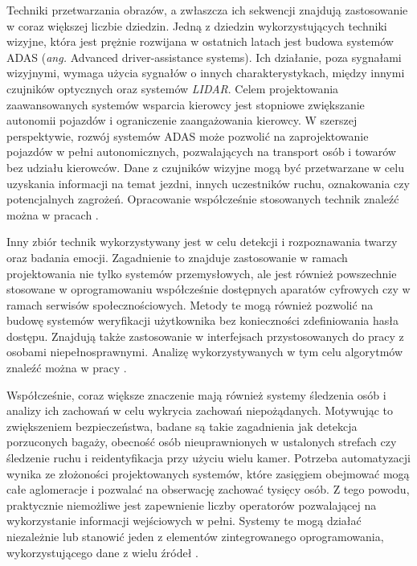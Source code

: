 Techniki przetwarzania obrazów, a zwłaszcza ich sekwencji znajdują zastosowanie w coraz większej liczbie dziedzin. %
Jedną z dziedzin wykorzystujących techniki wizyjne, która jest prężnie rozwijana w ostatnich latach jest budowa systemów ADAS (\emph{ang.} Advanced driver-assistance systems). %
Ich działanie, poza sygnałami wizyjnymi, wymaga użycia sygnałów o innych charakterystykach, między innymi czujników optycznych oraz systemów \emph{LIDAR}.
Celem projektowania zaawansowanych systemów wsparcia kierowcy jest stopniowe zwiększanie autonomii pojazdów i ograniczenie zaangażowania kierowcy. W szerszej perspektywie, rozwój systemów ADAS może pozwolić na zaprojektowanie pojazdów w pełni autonomicznych, pozwalających na transport osób i towarów bez udziału kierowców.
Dane z czujników wizyjne mogą być przetwarzane w celu uzyskania informacji na temat jezdni, innych uczestników ruchu, oznakowania czy potencjalnych zagrożeń. 
Opracowanie współcześnie stosowanych technik znaleźć można w pracach \cite{Bengler2014,Velez2017}.

Inny zbiór technik wykorzystywany jest w celu detekcji i rozpoznawania twarzy oraz badania emocji. %
Zagadnienie to znajduje zastosowanie w ramach projektowania nie tylko systemów przemysłowych, ale jest również powszechnie stosowane w oprogramowaniu współcześnie dostępnych aparatów cyfrowych czy w ramach serwisów społecznościowych. Metody te mogą również pozwolić na budowę systemów weryfikacji użytkownika bez konieczności zdefiniowania hasła dostępu. Znajdują także zastosowanie w interfejsach przystosowanych do pracy z osobami niepełnosprawnymi.
Analizę wykorzystywanych w tym celu algorytmów znaleźć można w pracy \cite{Anil2016}.

Współcześnie, coraz większe znaczenie mają również systemy śledzenia osób i analizy ich zachowań w celu wykrycia zachowań niepożądanych. %
Motywując to zwiększeniem bezpieczeństwa, badane są takie zagadnienia jak detekcja porzuconych bagaży, obecność osób nieuprawnionych w ustalonych strefach czy śledzenie ruchu i reidentyfikacja przy użyciu wielu kamer. %
Potrzeba automatyzacji wynika ze złożoności projektowanych systemów, które zasięgiem obejmować mogą całe aglomeracje i pozwalać na obserwację zachować tysięcy osób. Z tego powodu, praktycznie niemożliwe jest zapewnienie liczby operatorów pozwalającej na wykorzystanie informacji wejściowych w pełni.
Systemy te mogą działać niezależnie lub stanowić jeden z elementów zintegrowanego oprogramowania, wykorzystującego dane z wielu źródeł \cite{Sriram2016,Hussain2016,Gouo2015}.

